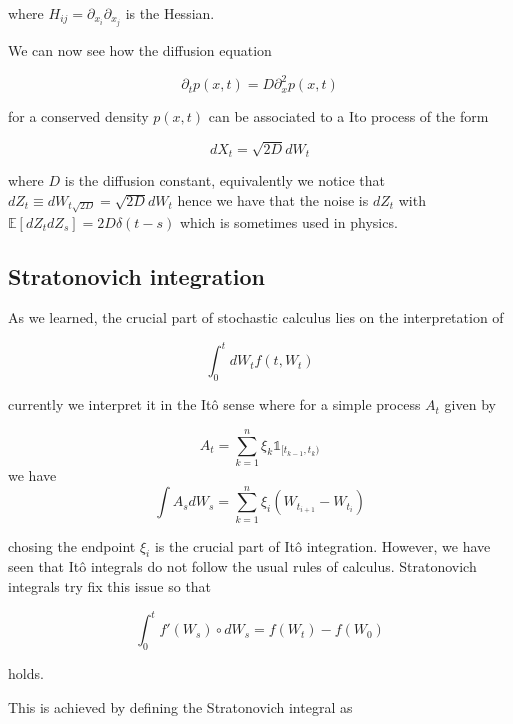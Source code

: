 \documentclass[11pt,a4paper]{article}
\begin{document}
where $H_{ij}=\partial_{x_i}\partial_{x_j}$ is the Hessian.

We can now see how the diffusion equation

\begin{equation}
    \partial_t p(x,t) = D \partial^2_xp(x,t)
\end{equation}

for a conserved density $p(x,t)$ can be associated to a Ito process of the form

\begin{equation}
    dX_t = \sqrt{2D}dW_t
\end{equation}

where $D$ is the diffusion constant, equivalently we notice that $dZ_t \equiv dW_{t\sqrt{2D}} = \sqrt{2D}dW_t$ hence we have that the noise is $dZ_t$ with $\mathbb{E}[dZ_tdZ_s] = 2D\delta(t-s)$ which is sometimes used in physics. 

\subsection{Stratonovich integration}

As we learned, the crucial part of stochastic calculus lies on the interpretation of

\begin{equation}
    \int_{0}^tdW_tf(t,W_t)
\end{equation}

currently we interpret it in the It\^{o} sense where for a simple process $A_t$ given by

\begin{equation}
    A_t = \sum_{k=1}^{n} \xi_k  \mathds{1}_{[t_{k-1},t_{k})}   
    \end{equation}
we have
\begin{equation}
    \int A_sdW_s = \sum_{k = 1}^{n}\xi_i(W_{t_{i+1}}-W_{t_i})
\end{equation}

chosing the endpoint $\xi_i$ is the crucial part of It\^{o} integration. However, we have seen that It\^{o} integrals do not follow the usual rules of calculus. Stratonovich integrals try fix this issue so that

\begin{equation}
\int_0^t f'(W_s)\circ dW_s = f(W_t)-f(W_0)
\end{equation}

holds.

This is achieved by defining the Stratonovich integral as
\end{document}
